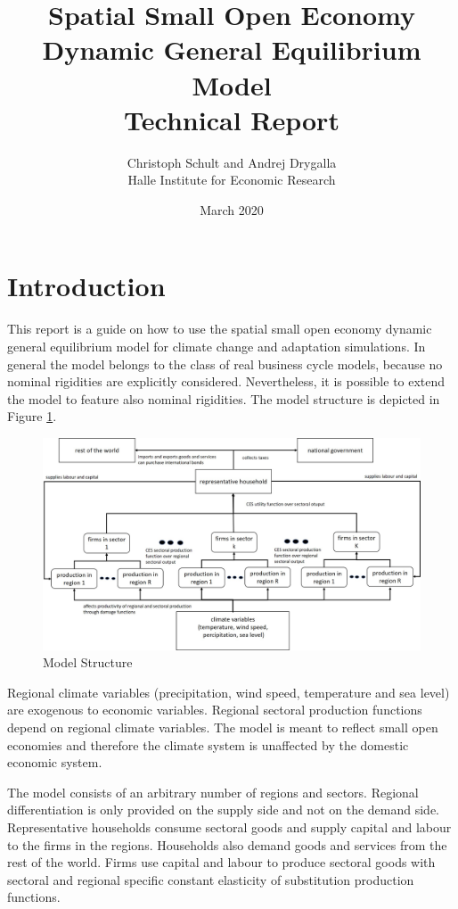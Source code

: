 \documentclass[10pt,a4paper]{article}
\title{Spatial Small Open Economy Dynamic General Equilibrium Model \\
\large{Technical Report}}
\date{March 2020}
\author{Christoph Schult and Andrej Drygalla \\ Halle Institute for Economic Research}
\begin{document}
\maketitle

\section{Introduction}
This report is a guide on how to use the spatial small open economy dynamic general equilibrium model for climate change and adaptation simulations. In general the model belongs to the class of real business cycle models, because no nominal rigidities are explicitly considered. Nevertheless, it is possible to extend the model to feature also nominal rigidities. The model structure is depicted in Figure \ref{fig:ModelStructure}.
\begin{figure}[h]
\caption{Model Structure}\label{fig:ModelStructure}
\includegraphics[width = 1\textwidth, height = 0.7\textwidth]{ModelStructure.jpg}
\end{figure}
Regional climate variables (precipitation, wind speed, temperature and sea level) are exogenous to economic variables. Regional sectoral production functions depend on regional climate variables. The model is meant to reflect small open economies and therefore the climate system is unaffected by the domestic economic system.

The model consists of an arbitrary number of regions and sectors. Regional differentiation is only provided on the supply side and not on the demand side. Representative households consume sectoral goods and supply capital and labour to the firms in the regions. Households also demand goods and services from the rest of the world. Firms use capital and labour to produce sectoral goods with sectoral and regional specific constant elasticity of substitution production functions.
\end{document}
